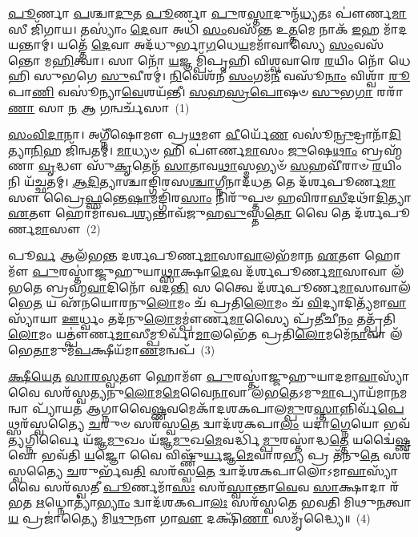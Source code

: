 \setcounter{anuvakam}{0}
\-\ul{𑌪𑍂}\-𑌰𑍍𑌣𑌾 \ul{𑌪}\-𑌶𑍍𑌚𑌾\-\ul{𑌦𑍁}\-𑌤 \ul{𑌪𑍂}\-𑌰𑍍𑌣𑌾 \ul{𑌪𑍁}\-𑌰\-\ul{𑌸𑍍𑌤𑌾}\-𑌦𑍁𑌨𑍍𑌮᳴\-\ul{𑌧𑍍𑌯}\-𑌤𑌃 𑌪𑍗॑𑌰𑍍𑌣\-\ul{𑌮𑌾}\-𑌸𑍀 𑌜𑌿᳴𑌗𑌾𑌯। 𑌤𑌸𑍍𑌯𑌾𑌂॑ \ul{𑌦𑍇}\-𑌵𑌾 𑌅𑌧𑌿᳴ \ul{𑌸𑌂}\-𑌵𑌸᳴𑌨𑍍𑌤 𑌉\-\ul{𑌤𑍍𑌤}\-𑌮𑍇 𑌨𑌾𑌕᳴ \ul{𑌇}\-𑌹 𑌮𑌾᳴𑌦𑌯𑌨𑍍𑌤𑌾𑌮𑍍। 𑌯𑌤𑍍𑌤𑍇᳴ \ul{𑌦𑍇}\-𑌵𑌾 𑌅𑌦᳴𑌧𑍁𑌰𑍍𑌭𑌾\-\ul{𑌗}\-𑌧𑍇\-\ul{𑌯}\-𑌮𑌮𑌾᳴𑌵𑌾𑌸𑍍𑌯𑍇 \ul{𑌸𑌂}\-𑌵𑌸᳴𑌨𑍍𑌤𑍋 𑌮\-\ul{𑌹𑌿}\-𑌤𑍍𑌵𑌾। 𑌸𑌾 𑌨𑍋᳴ \ul{𑌯}\-𑌜𑍍𑌞𑌮𑍍𑌪𑌿᳴𑌪𑍃𑌹𑌿 𑌵𑌿𑌶𑍍𑌵𑌵𑌾𑌰𑍇 \ul{𑌰}\-𑌯𑌿𑌂 𑌨𑍋᳴ 𑌧𑍇𑌹𑌿 𑌸𑍁𑌭𑌗𑍇 \ul{𑌸𑍁}\-𑌵𑍀𑌰𑌮𑍍॑। \ul{𑌨𑌿}\-𑌵𑍇𑌶᳴𑌨𑍀 \ul{𑌸𑌂}\-𑌗𑌮᳴\-\ul{𑌨𑍀} 𑌵𑌸𑍂᳴\-\ul{𑌨𑌾𑌂} 𑌵𑌿𑌶𑍍𑌵𑌾᳴ \ul{𑌰𑍂}\-𑌪𑌾\-\ul{𑌣𑌿} 𑌵𑌸𑍂॑𑌨𑍍𑌯𑌾\-\ul{𑌵𑍇}\-𑌶𑌯᳴𑌨𑍍𑌤𑍀। \ul{𑌸}\-\-\ul{𑌹}\-\-\ul{𑌸𑍍𑌰}\-\-\ul{𑌪𑍋}\-𑌷𑍞 \ul{𑌸𑍁}\-𑌭\-\ul{𑌗𑌾} 𑌰𑌰𑌾᳴\-\ul{𑌣𑌾} 𑌸𑌾 \ul{𑌨} 𑌆 \ul{𑌗}\-𑌨𑍍𑌵𑌰𑍍𑌚᳴𑌸𑌾~(1)

\-\ul{𑌸𑌂}\-\-\ul{𑌵𑌿}\-\-\ul{𑌦𑌾}\-𑌨𑌾। 𑌅𑌗𑍍𑌨𑍀᳴𑌷𑍋𑌮𑍗 𑌪𑍍𑌰\-\ul{𑌥}\-𑌮𑍗 \ul{𑌵𑍀}\-𑌰𑍍𑌯𑍇᳴\-\ul{𑌣} 𑌵𑌸𑍂॑\-\ul{𑌨𑍍𑌰𑍁}\-𑌦𑍍𑌰𑌾𑌨𑌾᳴\-\ul{𑌦𑌿}\-𑌤𑍍𑌯𑌾\-\ul{𑌨𑌿}\-𑌹 𑌜𑌿᳴𑌨𑍍𑌵𑌤𑌮𑍍। \ul{𑌮𑌾}\-𑌧𑍍𑌯𑍞 𑌹𑌿 𑌪𑍗॑𑌰𑍍𑌣\-\ul{𑌮𑌾}\-𑌸𑌂 \ul{𑌜𑍁}\-𑌷𑍇\-\ul{𑌥𑌾𑌂} 𑌬𑍍𑌰𑌹𑍍𑌮᳴𑌣𑌾 \ul{𑌵𑍃}\-𑌦𑍍𑌧𑍗 𑌸𑍁᳴\-\ul{𑌕𑍃}\-𑌤𑍇𑌨᳴ \ul{𑌸𑌾}\-𑌤𑌾𑌵\-\ul{𑌥𑌾}\-𑌸𑍍𑌮𑌭𑍍𑌯𑍞᳴ \ul{𑌸}\-𑌹𑌵𑍀᳴𑌰𑌾𑍞 \ul{𑌰}\-𑌯𑌿𑌂 𑌨𑌿 𑌯᳴𑌚𑍍𑌛𑌤𑌮𑍍। \ul{𑌆}\-\-\ul{𑌦𑌿}\-𑌤𑍍𑌯𑌾𑌶𑍍𑌚𑌾𑌙𑍍𑌗𑌿᳴𑌰𑌸\-\ul{𑌶𑍍𑌚𑌾}\-𑌗𑍍𑌨𑍀𑌨𑌾𑌦᳴𑌧\-\ul{𑌤} 𑌤𑍇 𑌦᳴𑌰𑍍\mbox{}𑌶𑌪𑍂𑌰𑍍𑌣\-\ul{𑌮𑌾}\-𑌸𑍗 𑌪𑍍𑌰𑍈\-\ul{𑌫𑍍𑌸}\-𑌨𑍍𑌤𑍇\-\ul{𑌷𑌾}\-𑌮𑌙𑍍𑌗𑌿᳴𑌰\-\ul{𑌸𑌾𑌂} 𑌨𑌿𑌰𑍁᳴𑌪𑍍𑌤𑍞 \ul{𑌹}\-𑌵𑌿𑌰𑌾\-\ul{𑌸𑍀}\-𑌦𑌥𑌾᳴\-\ul{𑌦𑌿}\-𑌤𑍍𑌯𑌾 \ul{𑌏}\-𑌤𑍗 𑌹𑍋𑌮𑌾᳴𑌵𑌪\-\ul{𑌶𑍍𑌯}\-𑌨𑍍𑌤𑌾𑌵᳴𑌜𑍁𑌹\-\ul{𑌵𑍁}\-𑌸𑍍𑌤\-\ul{𑌤𑍋} 𑌵𑍈 𑌤𑍇 𑌦᳴𑌰𑍍\mbox{}𑌶𑌪𑍂𑌰𑍍𑌣\-\ul{𑌮𑌾}\-𑌸𑍗~(2)

𑌪𑍂\-\ul{𑌰𑍍𑌵} 𑌆𑌲᳴𑌭𑌨𑍍𑌤 𑌦𑌰𑍍\mbox{}𑌶𑌪𑍂𑌰𑍍𑌣\-\ul{𑌮𑌾}\-𑌸𑌾\-\ul{𑌵𑌾}\-𑌲𑌭᳴𑌮𑌾𑌨 \ul{𑌏}\-𑌤𑍗 𑌹𑍋𑌮𑍗᳴ \ul{𑌪𑍁}\-𑌰𑌸𑍍𑌤𑌾॑𑌜𑍍𑌜𑍁𑌹𑍁𑌯𑌾\-\ul{𑌥𑍍𑌸𑌾}\-𑌕𑍍𑌷𑌾\-\ul{𑌦𑍇}\-𑌵 𑌦᳴𑌰𑍍\mbox{}𑌶𑌪𑍂𑌰𑍍𑌣\-\ul{𑌮𑌾}\-𑌸𑌾𑌵𑌾 𑌲᳴𑌭𑌤𑍇 𑌬𑍍𑌰𑌹𑍍𑌮\-\ul{𑌵𑌾}\-𑌦𑌿𑌨𑍋᳴ 𑌵𑌦\-\ul{𑌨𑍍𑌤𑌿} 𑌸 𑌤𑍍𑌵𑍈 𑌦᳴𑌰𑍍\mbox{}𑌶𑌪𑍂𑌰𑍍𑌣\-\ul{𑌮𑌾}\-𑌸𑌾𑌵𑌾\-𑌲᳴𑌭𑍇\-\ul{𑌤} 𑌯 𑌏᳴𑌨𑌯𑍋𑌰𑌨𑍁\-\ul{𑌲𑍋}\-𑌮𑌂 𑌚᳴ 𑌪𑍍𑌰𑌤𑌿\-\ul{𑌲𑍋}\-𑌮𑌂 𑌚᳴ \ul{𑌵𑌿}\-𑌦𑍍𑌯𑌾𑌦𑌿𑌤𑍍𑌯᳴𑌮𑌾\-\ul{𑌵𑌾}\-𑌸𑍍𑌯𑌾᳴𑌯𑌾 \ul{𑌊}\-𑌰𑍍𑌧𑍍𑌵𑌂 𑌤𑌦᳴𑌨𑍁\-\ul{𑌲𑍋}\-𑌮\-𑌮𑍍𑌪𑍗॑𑌰𑍍𑌣\-\ul{𑌮𑌾}\-𑌸𑍍𑌯𑍈 𑌪𑍍𑌰᳴\-\ul{𑌤𑍀}\-𑌚𑍀\-\ul{𑌨𑌂} 𑌤𑌤𑍍𑌪𑍍𑌰᳴𑌤𑌿\-\ul{𑌲𑍋}\-𑌮𑌂 𑌯𑌤𑍍𑌪𑍗॑𑌰𑍍𑌣\-\ul{𑌮𑌾}\-𑌸𑍀𑌮𑍍𑌪𑍂𑌰𑍍𑌵𑌾᳴\-\ul{𑌮𑌾}\-𑌲𑌭𑍇᳴𑌤 𑌪𑍍𑌰𑌤𑌿\-\ul{𑌲𑍋}\-𑌮𑌮𑍇᳴\-\ul{𑌨𑌾}\-𑌵𑌾 𑌲᳴𑌭𑍇\-\ul{𑌤𑌾}\-𑌮𑍁𑌮᳴\-\ul{𑌪}\-𑌕𑍍𑌷𑍀𑌯᳴𑌮𑌾\-\ul{𑌣}\-𑌮𑌨𑍍𑌵𑌪᳴~(3)

\-\ul{𑌕𑍍𑌷𑍀}\-\-\ul{𑌯𑍇}\-\-\ul{𑌤} \ul{𑌸𑌾}\-\-\ul{𑌰}\-\-\ul{𑌸𑍍𑌵}\-𑌤𑍗 𑌹𑍋𑌮𑍗᳴ \ul{𑌪𑍁}\-𑌰𑌸𑍍𑌤𑌾॑𑌜𑍍𑌜𑍁𑌹𑍁𑌯𑌾𑌦𑌮𑌾\-\ul{𑌵𑌾}\-𑌸𑍍𑌯𑌾᳴ 𑌵𑍈 𑌸𑌰᳴𑌸𑍍𑌵𑌤𑍍𑌯𑌨𑍁\-\ul{𑌲𑍋}\-𑌮\-\ul{𑌮𑍇}\-𑌵𑍈\-\ul{𑌨𑌾}\-𑌵𑌾 𑌲᳴𑌭\-\ul{𑌤𑍇}\-\-𑌽𑌮𑍁\-\ul{𑌮𑌾}\-𑌪𑍍𑌯𑌾𑌯᳴𑌮𑌾\-\ul{𑌨}\-𑌮𑌨𑍍𑌵𑌾 𑌪𑍍𑌯𑌾᳴𑌯𑌤 𑌆𑌗𑍍𑌨𑌾𑌵𑍈\-\ul{𑌷𑍍𑌣}\-𑌵𑌮𑍇𑌕𑌾᳴\-𑌦𑌶\-𑌕𑌪𑌾𑌲\-\ul{𑌮𑍍𑌪𑍁}\-𑌰\-\ul{𑌸𑍍𑌤𑌾}\-𑌨𑍍𑌨𑌿𑌰𑍍𑌵᳴\-\ul{𑌪𑍇}\-𑌥𑍍𑌸𑌰᳴𑌸𑍍𑌵𑌤𑍍𑌯𑍈 \ul{𑌚}\-𑌰𑍁𑍞 𑌸𑌰᳴𑌸𑍍𑌵\-\ul{𑌤𑍇} 𑌦𑍍𑌵𑌾𑌦᳴𑌶\-𑌕𑌪𑌾\-\ul{𑌲𑌂} 𑌯𑌦𑌾॑\-\ul{𑌗𑍍𑌨𑍇}\-𑌯𑍋 𑌭𑌵᳴\-\ul{𑌤𑍍𑌯}\-𑌗𑍍𑌨𑌿𑌰𑍍𑌵𑍈 𑌯᳴𑌜𑍍𑌞\-\ul{𑌮𑍁}\-𑌖𑌂 𑌯᳴𑌜𑍍𑌞\-\ul{𑌮𑍁}\-𑌖\-\ul{𑌮𑍇}\-𑌵𑌰𑍍𑌦𑍍𑌧𑌿᳴\-\ul{𑌮𑍍𑌪𑍁}\-𑌰𑌸𑍍𑌤𑌾॑𑌦𑍍𑌧\-\ul{𑌤𑍍𑌤𑍇} 𑌯𑌦𑍍𑌵𑍈॑\-\ul{𑌷𑍍𑌣}\-𑌵𑍋 𑌭𑌵᳴𑌤𑌿 \ul{𑌯}\-𑌜𑍍𑌞𑍋 𑌵𑍈 𑌵𑌿𑌷𑍍𑌣𑍁᳴\-\ul{𑌰𑍍𑌯}\-𑌜𑍍𑌞\-\ul{𑌮𑍇}\-𑌵𑌾𑌰\-\ul{𑌭𑍍𑌯} 𑌪𑍍𑌰 𑌤᳴𑌨𑍁\-\ul{𑌤𑍇} 𑌸𑌰᳴𑌸𑍍𑌵𑌤𑍍𑌯𑍈 \ul{𑌚}\-𑌰𑍁𑌰𑍍𑌭᳴𑌵\-\ul{𑌤𑌿} 𑌸𑌰᳴𑌸𑍍𑌵\-\ul{𑌤𑍇} 𑌦𑍍𑌵𑌾𑌦᳴𑌶\-𑌕𑌪𑌾𑌲𑍋\-𑌽𑌮𑌾\-\ul{𑌵𑌾}\-𑌸𑍍𑌯𑌾᳴ 𑌵𑍈 𑌸𑌰᳴𑌸𑍍𑌵𑌤𑍀 \ul{𑌪𑍂}\-𑌰𑍍𑌣𑌮𑌾᳴\-\ul{𑌸𑌃} 𑌸𑌰᳴\-\ul{𑌸𑍍𑌵𑌾}\-𑌨𑍍𑌤𑌾\-\ul{𑌵𑍇}\-𑌵 \ul{𑌸𑌾}\-𑌕𑍍𑌷𑌾𑌦𑌾 𑌰᳴𑌭𑌤 \ul{𑌋}\-𑌧𑍍𑌨𑍋𑌤𑍍𑌯𑌾॑\-\ul{𑌭𑍍𑌯𑌾𑌂} 𑌦𑍍𑌵𑌾𑌦᳴𑌶\-𑌕𑌪𑌾\-\ul{𑌲𑌃} 𑌸𑌰᳴𑌸𑍍𑌵𑌤𑍇 𑌭𑌵𑌤𑌿 𑌮𑌿𑌥𑍁\-\ul{𑌨}\-𑌤𑍍𑌵𑌾\-\ul{𑌯} 𑌪𑍍𑌰𑌜𑌾॑𑌤𑍍𑌯𑍈 𑌮𑌿\-\ul{𑌥𑍁}\-𑌨𑍗 𑌗𑌾\-\ul{𑌵𑍗} 𑌦𑌕𑍍𑌷𑌿᳴\-\ul{𑌣𑌾} 𑌸𑌮𑍃᳴𑌦𑍍𑌧𑍍𑌯𑍈॥~(4)

